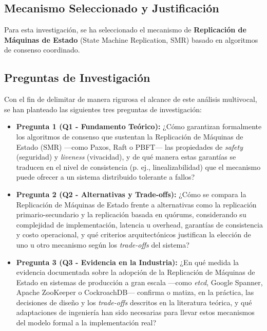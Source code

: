 \documentclass[12pt,letterpaper]{article}
\begin{document}
\subsection{Mecanismo Seleccionado y Justificación}
Para esta investigación, se ha seleccionado el mecanismo de \textbf{Replicación de Máquinas de Estado} (State Machine Replication, SMR) basado en algoritmos de consenso coordinado. 


\subsection{Preguntas de Investigación}
Con el fin de delimitar de manera rigurosa el alcance de este análisis multivocal, se han planteado las siguientes tres preguntas de investigación:

\begin{itemize}
    \item \textbf{Pregunta 1 (Q1 - Fundamento Teórico):} ¿Cómo garantizan formalmente los algoritmos de consenso que sustentan la Replicación de Máquinas de Estado (SMR) ---como Paxos, Raft o PBFT--- las propiedades de \textit{safety} (seguridad) y \textit{liveness} (vivacidad), y de qué manera estas garantías se traducen en el nivel de consistencia (p. ej., linealizabilidad) que el mecanismo puede ofrecer a un sistema distribuido tolerante a fallos?
    
    \item \textbf{Pregunta 2 (Q2 - Alternativas y Trade-offs):} ¿Cómo se compara la Replicación de Máquinas de Estado frente a alternativas como la replicación primario-secundario y la replicación basada en quórums, considerando su complejidad de implementación, latencia u overhead, garantías de consistencia y costo operacional, y qué criterios arquitectónicos justifican la elección de uno u otro mecanismo según los \textit{trade-offs} del sistema?
    
    \item \textbf{Pregunta 3 (Q3 - Evidencia en la Industria):} ¿En qué medida la evidencia documentada sobre la adopción de la Replicación de Máquinas de Estado en sistemas de producción a gran escala ---como \textit{etcd}, Google Spanner, Apache ZooKeeper o CockroachDB--- confirma o matiza, en la práctica, las decisiones de diseño y los \textit{trade-offs} descritos en la literatura teórica, y qué adaptaciones de ingeniería han sido necesarias para llevar estos mecanismos del modelo formal a la implementación real?
\end{itemize}
\end{document}
